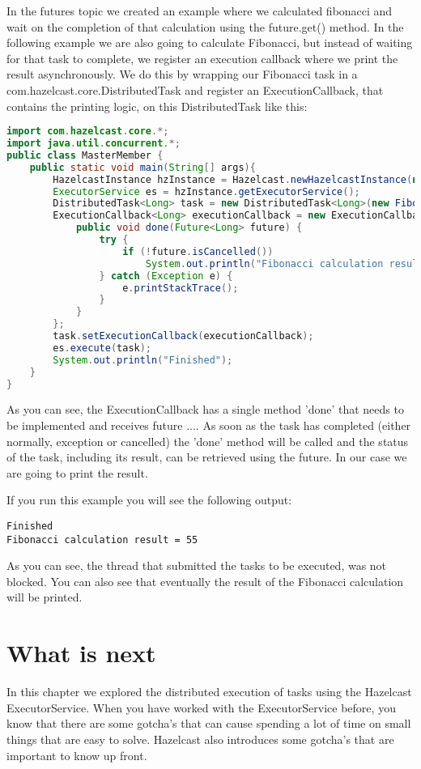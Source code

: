In the futures topic we created an example where we calculated fibonacci and wait on the completion of that calculation using the future.get() method. In the following example we are also going to calculate Fibonacci, but instead of waiting for that task to complete, we register an execution callback where we print the result asynchronously. We do this by wrapping our Fibonacci task in a com.hazelcast.core.DistributedTask and register an ExecutionCallback, that contains the printing logic, on this DistributedTask like this:
\begin{lstlisting}[language=java]
import com.hazelcast.core.*;
import java.util.concurrent.*;
public class MasterMember {
    public static void main(String[] args){
        HazelcastInstance hzInstance = Hazelcast.newHazelcastInstance(null);
        ExecutorService es = hzInstance.getExecutorService();
        DistributedTask<Long> task = new DistributedTask<Long>(new FibonacciCallable(10));
        ExecutionCallback<Long> executionCallback = new ExecutionCallback<Long>() {
            public void done(Future<Long> future) {
                try {
                    if (!future.isCancelled()) 
                        System.out.println("Fibonacci calculation result = " + future.get());
                } catch (Exception e) {
                    e.printStackTrace();
                }
            }
        };
        task.setExecutionCallback(executionCallback);
        es.execute(task);
        System.out.println("Finished");
    }
}
\end{lstlisting}
As you can see, the ExecutionCallback has a single method 'done' that needs to be implemented and receives future .... As soon as the task has completed (either normally, exception or cancelled) the 'done' method will be called and the status of the task, including its result, can be retrieved using the future. In our case we are going to print the result.

If you run this example you will see the following output:
\begin{lstlisting}
Finished
Fibonacci calculation result = 55
\end{lstlisting}
As you can see, the thread that submitted the tasks to be executed, was not blocked. You can also see that eventually the result of the Fibonacci calculation will be printed. 

\section{What is next}
In this chapter we explored the distributed execution of tasks using the Hazelcast ExecutorService. When you have worked with the ExecutorService before, you know that there are some gotcha's that can cause spending a lot of time on small things that are easy to solve. Hazelcast also introduces some gotcha's that are important to know up front.

